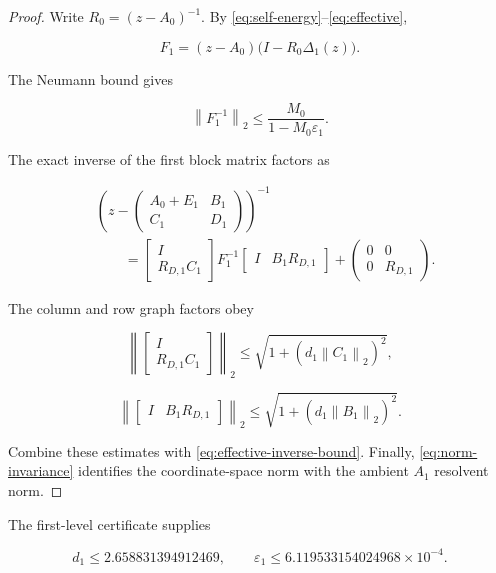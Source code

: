 \documentclass[11pt]{article}
\theoremstyle{definition}
\theoremstyle{remark}
\newcommand{\norm}[1]{\left\lVert #1\right\rVert}
\newcommand{\C}{\mathbb C}
\newcommand{\eps}{\varepsilon}
\begin{document}
\begin{proof}
Write $R_0=(z-A_0)^{-1}$.  By
\eqref{eq:self-energy}--\eqref{eq:effective},

\[
F_1=(z-A_0)\bigl(I-R_0\Delta_1(z)\bigr).
\]

The Neumann bound gives

\begin{equation}
 \norm{F_1^{-1}}_2\le\frac{M_0}{1-M_0\eps_1}.
 \label{eq:effective-inverse-bound}
\end{equation}

The exact inverse of the first block matrix factors as

\begin{equation}
\begin{split}
 &\left(
 z-\begin{pmatrix}A_0+E_1&B_1\\C_1&D_1\end{pmatrix}
 \right)^{-1}\\
 &\qquad=
 \begin{bmatrix}I\\R_{D,1}C_1\end{bmatrix}
 F_1^{-1}
 \begin{bmatrix}I&B_1R_{D,1}\end{bmatrix}
 +\begin{pmatrix}0&0\\0&R_{D,1}\end{pmatrix}.
\end{split}
\label{eq:block-inverse}
\end{equation}

The column and row graph factors obey

\[
\left\|\begin{bmatrix}I\\R_{D,1}C_1\end{bmatrix}\right\|_2
\le\sqrt{1+(d_1\norm{C_1}_2)^2},
\]

\[
\left\|\begin{bmatrix}I&B_1R_{D,1}\end{bmatrix}\right\|_2
\le\sqrt{1+(d_1\norm{B_1}_2)^2}.
\]

Combine these estimates with \eqref{eq:effective-inverse-bound}.  Finally,
\eqref{eq:norm-invariance} identifies the coordinate-space norm with the
ambient $A_1$ resolvent norm.
\end{proof}

The first-level certificate supplies

\begin{equation}
 d_1\le2.658831394912469,
 \qquad
 \eps_1\le6.119533154024968\times10^{-4}.
 \label{eq:first-constants}
\end{equation}
\end{document}
